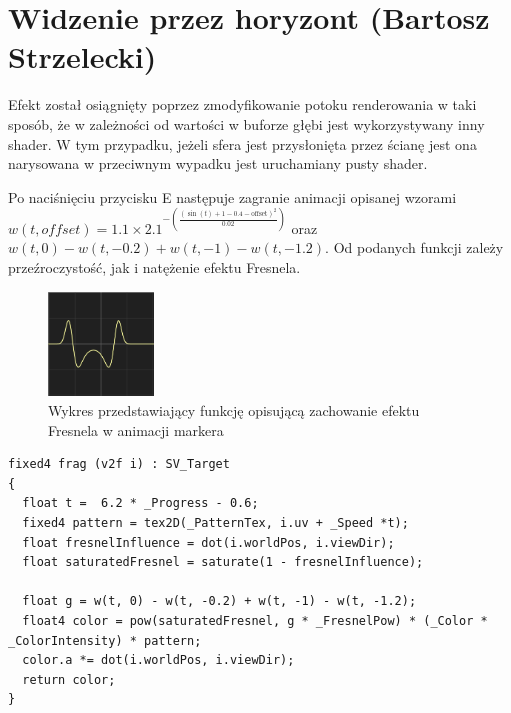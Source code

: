 \section{Widzenie przez horyzont (Bartosz Strzelecki)}
Efekt został osiągnięty poprzez zmodyfikowanie potoku renderowania w taki sposób, że w zależności od wartości w buforze głębi jest wykorzystywany inny shader.
W tym przypadku, jeżeli sfera jest przysłonięta przez ścianę jest ona narysowana w przeciwnym wypadku jest uruchamiany pusty shader.

Po naciśnięciu przycisku E następuje zagranie animacji opisanej wzorami $ w(t, offset) = 1.1 \times 2.1^{-\left(\frac{{\left(\sin(t) + 1 - 0.4 - \text{{offset}}\right)^2}}{{0.02}}\right)} $
oraz $ w(t, 0) - w(t, -0.2) + w(t, -1) - w(t, -1.2) $. Od podanych funkcji zależy przeźroczystość, jak i natężenie efektu Fresnela. 

\begin{figure}[h]
    \centering
    \includegraphics[width=0.25\textwidth]{images/g}
    \caption{Wykres przedstawiający funkcję opisującą zachowanie efektu Fresnela w animacji markera}
\end{figure}



\begin{lstlisting}[caption=Fragment shadera odpowiedzialny za animację]
fixed4 frag (v2f i) : SV_Target
{
  float t =  6.2 * _Progress - 0.6;
  fixed4 pattern = tex2D(_PatternTex, i.uv + _Speed *t);
  float fresnelInfluence = dot(i.worldPos, i.viewDir);
  float saturatedFresnel = saturate(1 - fresnelInfluence);

  float g = w(t, 0) - w(t, -0.2) + w(t, -1) - w(t, -1.2);
  float4 color = pow(saturatedFresnel, g * _FresnelPow) * (_Color * _ColorIntensity) * pattern;
  color.a *= dot(i.worldPos, i.viewDir);
  return color;
}
\end{lstlisting}
